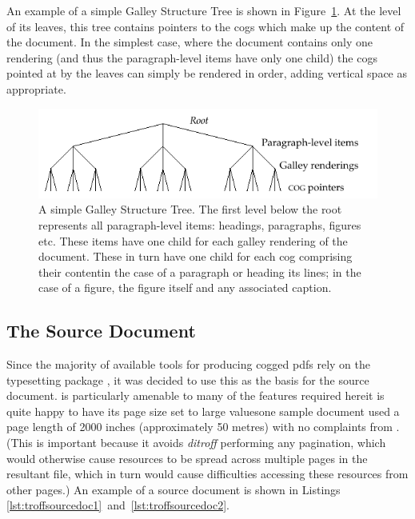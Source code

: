 An example of a simple Galley Structure Tree is shown in Figure~\ref{fig:tree}. At the level of its leaves, this tree contains pointers to the \glspl{cog} which make up the content of the document. In the simplest case, where the document contains only one rendering (and thus the pa\-ra\-graph-level items have only one child) the \glspl{cog} pointed at by the leaves can simply be rendered in order, adding vertical space as appropriate.

\begin{figure}
 \includegraphics[width=\textwidth]{gfx/tree}
 \caption[A simple Galley Structure Tree]{A simple Galley Structure Tree. The first level below the root represents all paragraph-level items: headings, paragraphs, figures etc. These items have one child for each galley rendering of the document. These in turn have one child for each \gls{cog} comprising their content\ed{}in the case of a paragraph or heading its lines; in the case of a figure, the figure itself and any associated caption.}
 \label{fig:tree}
\end{figure}

\subsection{The Source Document}\label{sec:srcdoc}
Since the majority of available tools for producing \gls{cog}ged \glspl{pdf} rely on the typesetting package \ditroff{},\hspace{0pt}\cite{Kernighan1982} it was decided to use this as the basis for the source document. \Ditroff{} is particularly amenable to many of the features required here\ed{}it is quite happy to have its page size set to large values\ed{}one sample document used a page length of 2000 inches (approximately 50 metres) with no complaints from \ditroff{}. (This is important because it avoids \emph{ditroff} performing any pagination, which would otherwise cause \COG{} resources to be spread across multiple pages in the resultant \pdf{} file, which in turn would cause difficulties accessing these resources from other pages.) An example of a source document is shown in Listings \ref{lst:troffsourcedoc1}~and~\ref{lst:troffsourcedoc2}.



